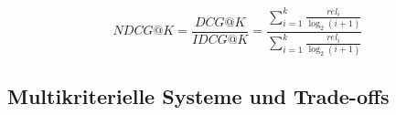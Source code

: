 \label{sec:idcg}

\begin{equation}
\label{eq:ndcg}
NDCG@K=\frac{DCG@K}{IDCG@K}=\frac{\sum_{i=1}^{k}\frac{rel_{i}}{\log_2(i+1)}}{\sum_{i=1}^{k}\frac{rel_{i}}{\log_2(i+1)}}
\end{equation}

\subsection{Multikriterielle Systeme und Trade-offs}

